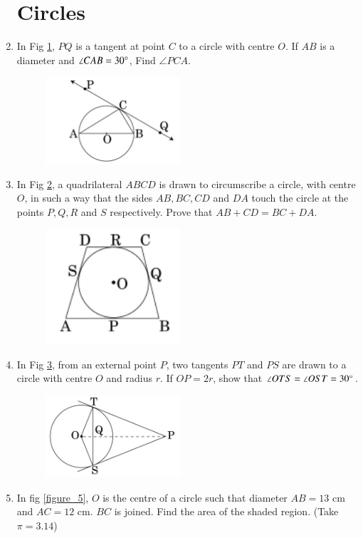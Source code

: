 \documentclass[12pt,-letter paper]{article}
\theoremstyle{remark}
\begin{document}
\begin{enumerate}
\section{Circles}
\item In Fig \ref{figure_2}, $PQ$ is a tangent at point $C$ to a circle with centre $O$. If $AB$ is a diameter and $\angle CAB = 30\degree $, Find $\angle PCA$.\\
\begin{figure}[H]
\centering
	\includegraphics[width=5cm]{figs/1.png}
	\caption{}
\label{figure_2}
\end{figure} 
\item  In Fig \ref{figure_3}, a quadrilateral $ABCD$ is drawn to circumscribe a circle, with centre $O$, in such a way that the sides $AB, BC, CD$ and $DA$ touch the circle at the points $P, Q, R$ and $S$ respectively. Prove that $ AB + CD= BC + DA $.\\
	\begin{figure}[H]
\centering
      \includegraphics[width=5cm]{figs/2.png}
      \caption{}
      \label{figure_3}
\end{figure} 
\item  In Fig \ref{figure_4}, from an external point $P$, two tangents $PT$ and $PS$ are drawn to a circle with centre $O$ and radius $r$. If $OP = 2r$, show that $\angle OTS = \angle OST= 30\degree$.
\begin{figure}[H]
\centering
\includegraphics[width=5cm]{figs/3.png}
\caption{}
      \label{figure_4}
   \end{figure} 
 \item  In fig \ref{figure_5}, $O$ is the centre of a circle such that diameter $AB = 13$ cm and $AC = 12$ cm. $BC$ is joined. Find the area of the shaded region. (Take $\pi = 3.14$)\\


\end{enumerate}
\end{document}
